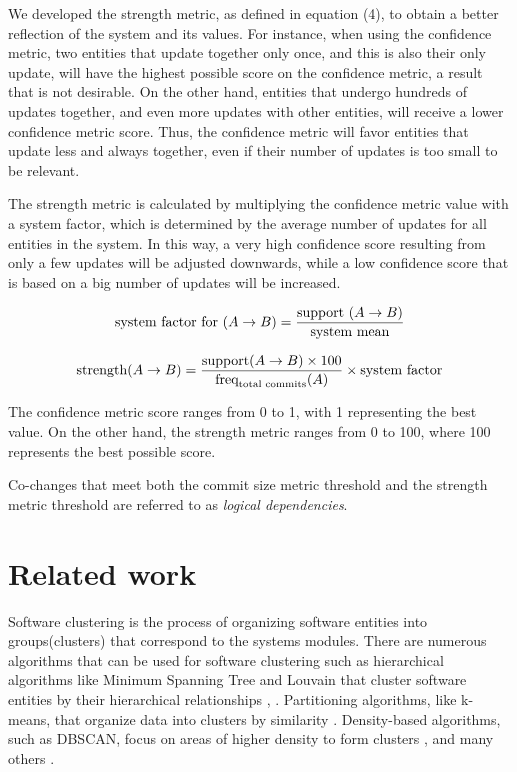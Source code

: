 \documentclass[conference, a4paper]{IEEEtran}
\begin{document}
We developed the strength metric, as defined in equation (4), to obtain a better reflection of the system and its values. For instance, when using the confidence metric, two entities that update together only once, and this is also their only update, will have the highest possible score on the confidence metric, a result that is not desirable. On the other hand, entities that undergo hundreds of updates together, and even more updates with other entities, will receive a lower confidence metric score. Thus, the confidence metric will favor entities that update less and always together, even if their number of updates is too small to be relevant.


 The strength metric is calculated by multiplying the confidence metric value with a system factor, which is determined by the average number of updates for all entities in the system. In this way, a very high confidence score resulting from only a few updates will be adjusted downwards, while a low confidence score that is based on a big number of updates will be increased.

\begin{equation}
\small
\text{system factor for }(A \rightarrow B) = \frac{\text{support }(A \rightarrow B)}{\text{system mean}}
\end{equation}

\begin{equation}
\small
\text{strength}(A \rightarrow B) = \frac{\text{support}(A \rightarrow B) \times 100}{\text{freq}_{\text{total commits}}(A)} \times \text{system factor}
\end{equation}

The confidence metric score ranges from 0 to 1, with 1 representing the best value. On the other hand, the strength metric ranges from 0 to 100, where 100 represents the best possible score.

Co-changes that meet both the commit size metric threshold and the strength metric threshold are referred to as \textit{logical dependencies}.

\section{Related work}
\label{related_work}

Software clustering is the process of organizing software entities into groups(clusters) that correspond to the systems modules. There are numerous algorithms that can be used for software clustering such as hierarchical algorithms like Minimum Spanning Tree and Louvain that cluster software entities by their hierarchical relationships \cite{hicluster}, \cite{SoraSem13}. Partitioning algorithms, like k-means, that organize data into clusters by similarity \cite{5453745}. Density-based algorithms, such as DBSCAN, focus on areas of higher density to form clusters \cite{10.1145/304181.304187}, and many others \cite{Xu2015ACS}. 
\end{document}
